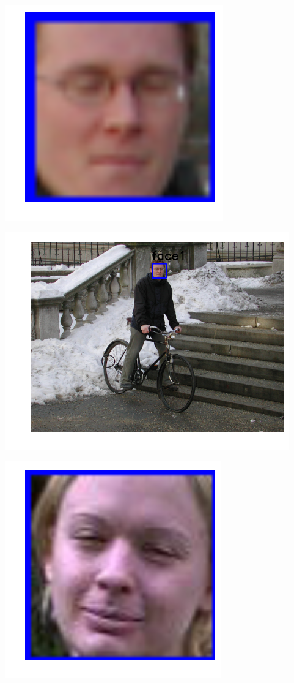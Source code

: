 \includegraphics{facedetection_files/facedetection_59_7.png}

\includegraphics{facedetection_files/facedetection_59_8.png}

\includegraphics{facedetection_files/facedetection_59_9.png}

